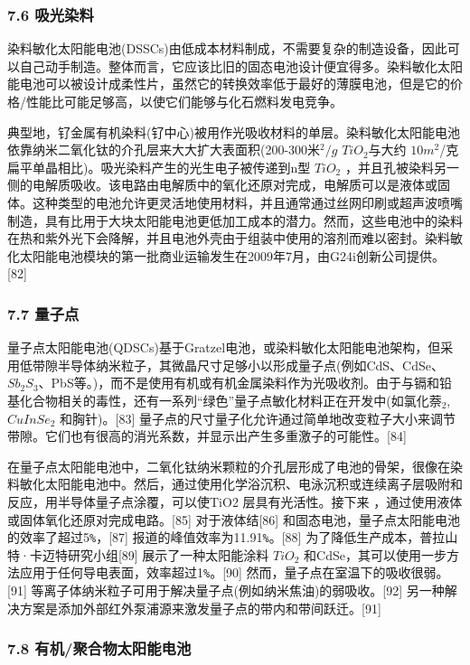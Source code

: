 \subsubsection{7.6 吸光染料}

染料敏化太阳能电池(DSSCs)由低成本材料制成，不需要复杂的制造设备，因此可以自己动手制造。整体而言，它应该比旧的固态电池设计便宜得多。染料敏化太阳能电池可以被设计成柔性片，虽然它的转换效率低于最好的薄膜电池，但是它的价格/性能比可能足够高，以使它们能够与化石燃料发电竞争。

典型地，钌金属有机染料(钌中心)被用作光吸收材料的单层。染料敏化太阳能电池依靠纳米二氧化钛的介孔层来大大扩大表面积(200-300米$^2/g$ $TiO_2$与大约 $10 m^2$/克扁平单晶相比)。吸光染料产生的光生电子被传递到n型 $TiO_2$ ，并且孔被染料另一侧的电解质吸收。该电路由电解质中的氧化还原对完成，电解质可以是液体或固体。这种类型的电池允许更灵活地使用材料，并且通常通过丝网印刷或超声波喷嘴制造，具有比用于大块太阳能电池更低加工成本的潜力。然而，这些电池中的染料在热和紫外光下会降解，并且电池外壳由于组装中使用的溶剂而难以密封。染料敏化太阳能电池模块的第一批商业运输发生在2009年7月，由G24i创新公司提供。[82]

\subsubsection{7.7 量子点}

量子点太阳能电池(QDSCs)基于Gratzel电池，或染料敏化太阳能电池架构，但采用低带隙半导体纳米粒子，其微晶尺寸足够小以形成量子点(例如CdS、CdSe、 $Sb_2S_3$、PbS等。)，而不是使用有机或有机金属染料作为光吸收剂。由于与镉和铅基化合物相关的毒性，还有一系列“绿色”量子点敏化材料正在开发中(如氯化萘$_2$, $CuInSe_2$ 和胸针)。[83] 量子点的尺寸量子化允许通过简单地改变粒子大小来调节带隙。它们也有很高的消光系数，并显示出产生多重激子的可能性。[84]

在量子点太阳能电池中，二氧化钛纳米颗粒的介孔层形成了电池的骨架，很像在染料敏化太阳能电池中。然后，通过使用化学浴沉积、电泳沉积或连续离子层吸附和反应，用半导体量子点涂覆，可以使TiO2 层具有光活性。接下来 ，通过使用液体或固体氧化还原对完成电路。[85] 对于液体结[86] 和固态电池，量子点太阳能电池的效率了超过5\verb`%`，[87] 报道的峰值效率为11.91\verb`%`。[88] 为了降低生产成本，普拉山特·卡迈特研究小组[89] 展示了一种太阳能涂料 $TiO_2$ 和CdSe，其可以使用一步方法应用于任何导电表面，效率超过1\verb`%`。[90] 然而，量子点在室温下的吸收很弱。[91] 等离子体纳米粒子可用于解决量子点(例如纳米焦油)的弱吸收。[92] 另一种解决方案是添加外部红外泵浦源来激发量子点的带内和带间跃迁。[91]

\subsubsection{7.8 有机/聚合物太阳能电池}

